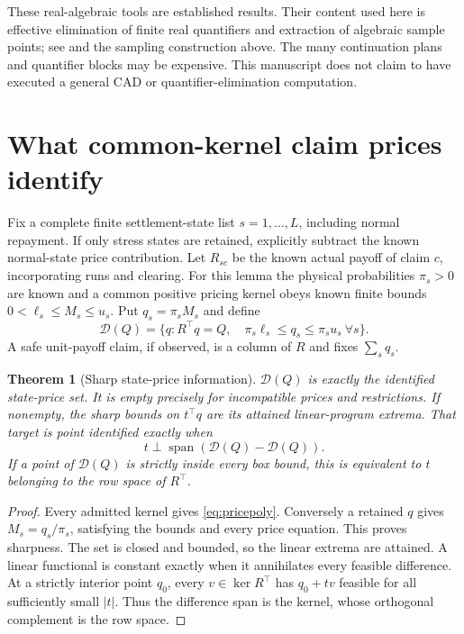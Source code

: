 \documentclass[11pt,a4paper]{article}
\numberwithin{equation}{section}
\newtheorem{theorem}{Theorem}[section]
\theoremstyle{definition}
\DeclareMathOperator{\spanlin}{span}
\begin{document}
These real-algebraic tools are established results.
Their content used here is effective elimination of finite real quantifiers
and extraction of algebraic sample points; see
\cite[Theorem~2.27]{basu} and the sampling construction above. The many continuation plans and
quantifier blocks may be expensive. This manuscript does not claim to
have executed a general CAD or quantifier-elimination computation.

\section{What common-kernel claim prices identify}\label{sec:generalid}

Fix a complete finite settlement-state list \(s=1,\ldots,L\), including
normal repayment. If only stress states are retained, explicitly subtract
the known normal-state price contribution. Let \(R_{sc}\) be the known
actual payoff of claim \(c\), incorporating runs and clearing.
For this lemma the physical probabilities \(\pi_s>0\) are known and a
common positive pricing kernel obeys known finite bounds
\(0<\ell_s\le M_s\le u_s\). Put \(q_s=\pi_sM_s\) and define
\begin{equation}\label{eq:pricepoly}
\mathcal D(Q)=
\{q:R^\top q=Q,\quad \pi_s\ell_s\le q_s\le\pi_su_s\ \forall s\}.
\end{equation}
A safe unit-payoff claim, if observed, is a column of \(R\) and fixes
\(\sum_s q_s\).

\begin{theorem}[Sharp state-price information]\label{thm:pricepoly}
\(\mathcal D(Q)\) is exactly the identified state-price set. It is empty
precisely for incompatible prices and restrictions. If nonempty, the
sharp bounds on \(t^\top q\) are its attained linear-program extrema.
That target is point identified exactly when
\[
t\perp\spanlin(\mathcal D(Q)-\mathcal D(Q)).
\]
If a point of \(\mathcal D(Q)\) is strictly inside every box bound, this
is equivalent to \(t\) belonging to the row space of \(R^\top\).
\end{theorem}
\begin{proof}
Every admitted kernel gives \eqref{eq:pricepoly}. Conversely a retained
\(q\) gives \(M_s=q_s/\pi_s\), satisfying the bounds and every price
equation. This proves sharpness. The set is closed and bounded, so the
linear extrema are attained. A linear functional is constant exactly
when it annihilates every feasible difference. At a strictly interior
point \(q_0\), every \(v\in\ker R^\top\) has \(q_0+tv\) feasible for all
sufficiently small \(|t|\). Thus the difference span is the kernel, whose
orthogonal complement is the row space.
\end{proof}
\end{document}

